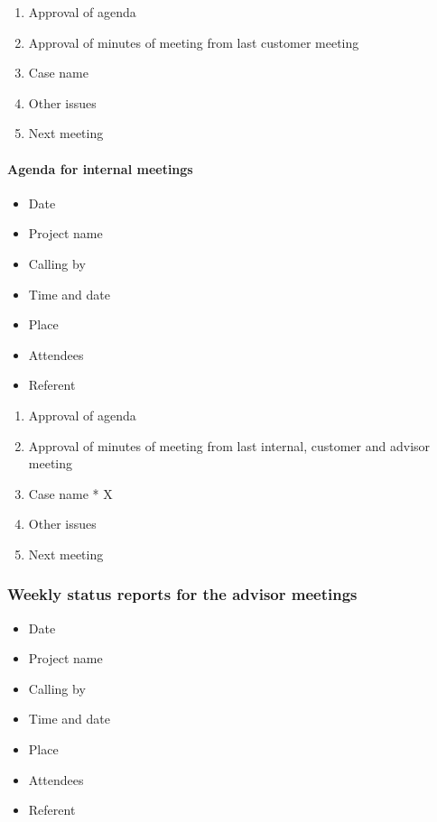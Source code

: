 \begin{enumerate}
\item{}Approval of agenda
\item{}Approval of minutes of meeting from last customer meeting
\item{}Case name
\item{}Other issues
\item{}Next meeting
\end{enumerate}

\paragraph{Agenda for internal meetings} \hfill
\newline
\begin{itemize}
\item{}Date
\item{}Project name
\item{}Calling by
\item{}Time and date 
\item{}Place 
\item{}Attendees 
\item{}Referent
\end{itemize}

\begin{enumerate}
\item{}Approval of agenda
\item{}Approval of minutes of meeting from last internal, customer and advisor meeting
\item{}Case name * X
\item{}Other issues
\item{}Next meeting
\end{enumerate}

\subsubsection{Weekly status reports for the advisor meetings}
\begin{itemize}
\item{}Date
\item{}Project name
\item{}Calling by
\item{}Time and date 
\item{}Place 
\item{}Attendees 
\item{}Referent
\end{itemize}

